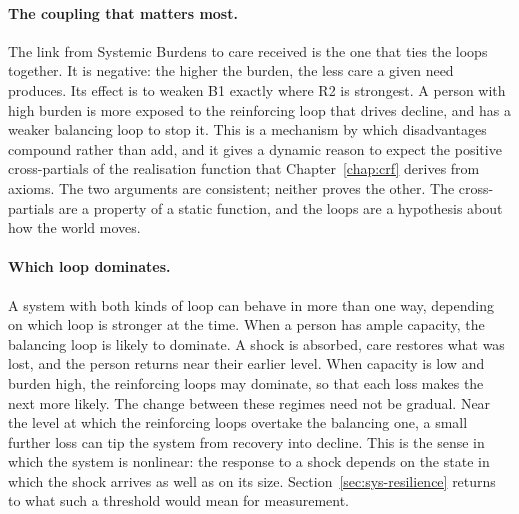 \paragraph{The coupling that matters most.} The link from Systemic Burdens to
care received is the one that ties the loops together. It is negative: the
higher the burden, the less care a given need produces. Its effect is to
weaken B1 exactly where R2 is strongest. A person with high burden is more
exposed to the reinforcing loop that drives decline, and has a weaker
balancing loop to stop it. This is a mechanism by which disadvantages
compound rather than add, and it gives a dynamic reason to expect the positive
cross-partials of the realisation function that Chapter~\ref{chap:crf}
derives from axioms. The two arguments are consistent; neither proves the
other. The cross-partials are a property of a static function, and the loops
are a hypothesis about how the world moves.

\paragraph{Which loop dominates.} A system with both kinds of loop can behave
in more than one way, depending on which loop is stronger at the time. When a
person has ample capacity, the balancing loop is likely to dominate. A shock is
absorbed, care restores what was lost, and the person returns near their
earlier level. When capacity is low and burden high, the reinforcing loops may
dominate, so that each loss makes the next more likely. The change between
these regimes need not be gradual. Near the level at which the reinforcing
loops overtake the balancing one, a small further loss can tip the system
from recovery into decline. This is the sense in which the system is
nonlinear: the response to a shock depends on the state in which the shock
arrives as well as on its size. Section~\ref{sec:sys-resilience} returns to
what such a threshold would mean for measurement.


